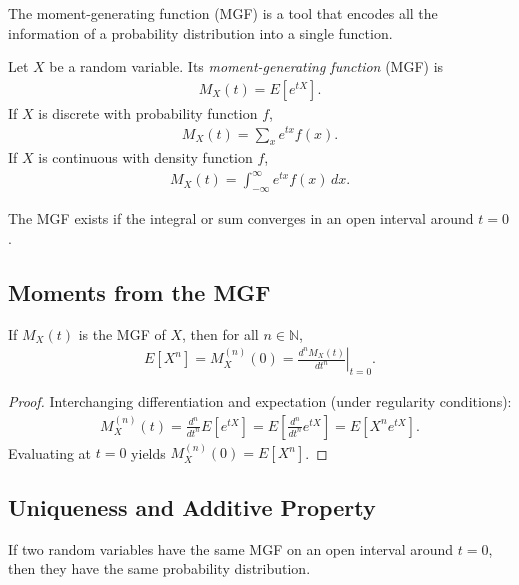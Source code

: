 The moment-generating function (MGF) is a tool that encodes all the information of a probability distribution into a single function.

\begin{definicion}
Let $X$ be a random variable. Its \emph{moment-generating function} (MGF) is
\begin{align}
 \label{eq:2.8.11}
 M_X(t) = E\!\left[e^{tX}\right].
\end{align}
If $X$ is discrete with probability function $f$,
\begin{align}
 M_X(t) = \sum_x e^{tx} f(x).
\end{align}
If $X$ is continuous with density function $f$,
\begin{align}
 M_X(t) = \int_{-\infty}^{\infty} e^{tx} f(x)\,dx.
\end{align}
\end{definicion}

The MGF exists if the integral or sum converges in an open interval around $t=0$.

\subsection{Moments from the MGF}

\begin{teorema}
If $M_X(t)$ is the MGF of $X$, then for all $n \in \mathbb{N}$,
\begin{align}
 \label{eq:2.8.12}
 E\!\left[X^n\right] = M_X^{(n)}(0) = \left.\frac{d^n M_X(t)}{dt^n}\right|_{t=0}.
\end{align}
\end{teorema}

\begin{proof}
Interchanging differentiation and expectation (under regularity conditions):
\begin{align}
 M_X^{(n)}(t) = \frac{d^n}{dt^n}E[e^{tX}] = E\!\left[\frac{d^n}{dt^n}e^{tX}\right]
 = E\!\left[X^n e^{tX}\right].
\end{align}
Evaluating at $t=0$ yields $M_X^{(n)}(0) = E[X^n]$.
\end{proof}

\subsection{Uniqueness and Additive Property}

\begin{teorema}[Uniqueness]
If two random variables have the same MGF on an open interval around $t=0$, then they have the same probability distribution.
\end{teorema}

